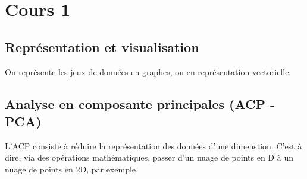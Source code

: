 \section{Cours 1}
\subsection{Représentation et visualisation}
On représente les jeux de données en graphes, ou en représentation vectorielle.

\subsection{Analyse en composante principales (ACP - PCA)}
L'ACP consiste à réduire la représentation des données d'une dimenstion. C'est à dire, via des opérations mathématiques,
passer d'un nuage de points en D à un nuage de points en 2D, par exemple.
